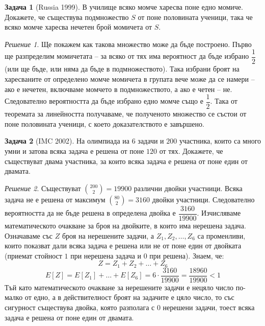 \documentclass[11 pt, a4paper]{article}
\theoremstyle{definition}
\newtheorem{p}{Задача}
\theoremstyle{remark}
\newtheorem*{s}{Решение}
\begin{document}
\begin{p}[Russia 1999]

В училище всяко момче харесва поне едно момиче. Докажете, че съществува подмножество $S$ от поне половината ученици, така че всяко момче харесва нечетен брой момичета от $S$.\par
\end{p}
\begin{s}
Ще покажем как такова множество може да бъде построено. Първо ще разпределим момичетата -- за всяко от тях има вероятност да бъде избрано $\dfrac{1}{2}$ (или ще бъде, или няма да бъде в подмножеството). Така избрани броят на харесваните от определено момче момичета в групата вече може да се намери -- ако е нечетен, включваме момчето в подмножеството, а ако е четен -- не. Следователно вероятността да бъде избрано едно момче също е $\dfrac{1}{2}$. Така от теоремата за линейността получаваме, че полученото множество се състои от поне половината ученици, с което доказателството е завършено.
\end{s}
\begin{p}[IMC 2002]

На олимпиада иа $6$ задачи и $200$ участника, които са много умни и затова всяка задача е решена от поне $120$ от тях. Докажете, че съществуват двама участника, за които всяка задача е решена от поне един от двамата.\par
\end{p}
\begin{s}
Съществуват ${200\choose{2}}=19900$ различни двойки участници.
Всяка задача не е решена от максимум ${80\choose{2}}=3160$ двойки участници. Следователно вероятността да не бъде решена в определена двойка е $\dfrac{3160}{19900}$. Изчисляваме математическото очакване за броя на двойките, в които има нерешена задача. Означаваме със $Z$ броя на нерешените задачи, а $Z_1, Z_2,\dots,Z_6$ са променливи, които показват дали всяка задача е решена или не от поне един от двойката (приемат стойност $1$ при нерешена задача и $0$ при решена). Знаем, че:
\begin{equation*}
Z=Z_1+Z_2+\dots+Z_6
\end{equation*}
\begin{equation*}
E[Z]=E[Z_1]+\dots+E[Z_6]=6\cdot\dfrac{3160}{19900}=\dfrac{18960}{19900}<1
\end{equation*}
Тъй като математическото очакване за нерешените задачи е нецяло число по-малко от едно, а в действителност броят на задачите е цяло число, то със сигурност съществува двойка, която разполага с $0$ нерешени задачи, тоест всяка задача е решена от поне един от двамата.\\
\end{s}
\end{document}
